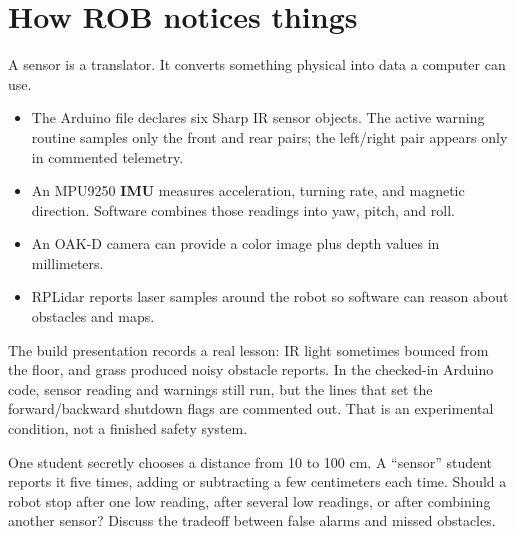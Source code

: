 \documentclass[11pt,openany]{book}
\begin{document}
\chapter{How ROB notices things}

A sensor is a translator. It converts something physical into data a computer can use.

\begin{itemize}
  \item The Arduino file declares six Sharp IR sensor objects. The active warning routine samples only the front and rear pairs; the left/right pair appears only in commented telemetry.
  \item An MPU9250 \textbf{IMU} measures acceleration, turning rate, and magnetic direction. Software combines those readings into yaw, pitch, and roll.
  \item An OAK-D camera can provide a color image plus depth values in millimeters.
  \item RPLidar reports laser samples around the robot so software can reason about obstacles and maps.
\end{itemize}


\begin{fieldnotebox}
The build presentation records a real lesson: IR light sometimes bounced from the floor, and grass produced noisy obstacle reports. In the checked-in Arduino code, sensor reading and warnings still run, but the lines that set the forward/backward shutdown flags are commented out. That is an experimental condition, not a finished safety system.
\end{fieldnotebox}

\begin{buildbox}[title={NOISY SENSOR GAME}]
One student secretly chooses a distance from 10 to 100 cm. A ``sensor'' student reports it five times, adding or subtracting a few centimeters each time. Should a robot stop after one low reading, after several low readings, or after combining another sensor? Discuss the tradeoff between false alarms and missed obstacles.
\end{buildbox}

\end{document}
